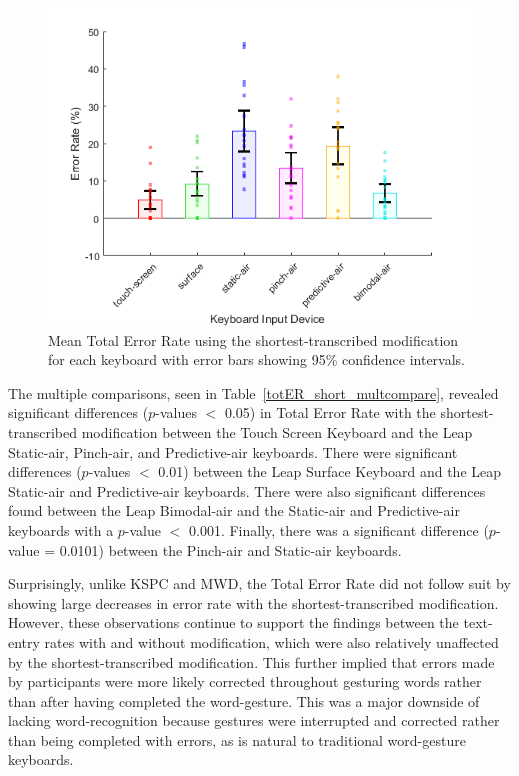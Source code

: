 \begin{figure}[!b]
	\centering
	\includegraphics{Figures/fig_totER_short_mean}
	\caption[Mean Total Error Rate for Modified-shortest]{Mean Total Error Rate using the shortest-transcribed modification for each keyboard with error bars showing 95\% confidence intervals.}
	\label{fig_totER_short_mean}
\end{figure}

The multiple comparisons, seen in Table~\ref{totER_short_multcompare}, revealed significant differences ($p$-values $<$ 0.05) in Total Error Rate with the shortest-transcribed modification between the Touch Screen Keyboard and the Leap Static-air, Pinch-air, and Predictive-air keyboards. There were significant differences ($p$-values $<$ 0.01) between the Leap Surface Keyboard and the Leap Static-air and Predictive-air keyboards. There were also significant differences found between the Leap Bimodal-air and the Static-air and Predictive-air keyboards with a $p$-value $<$ 0.001. Finally, there was a significant difference ($p$-value = 0.0101) between the Pinch-air and Static-air keyboards.

Surprisingly, unlike KSPC and MWD, the Total Error Rate did not follow suit by showing large decreases in error rate with the shortest-transcribed modification. However, these observations continue to support the findings between the text-entry rates with and without modification, which were also relatively unaffected by the shortest-transcribed modification. This further implied that errors made by participants were more likely corrected throughout gesturing words rather than after having completed the word-gesture. This was a major downside of lacking word-recognition because gestures were interrupted and corrected rather than being completed with errors, as is natural to traditional word-gesture keyboards.

